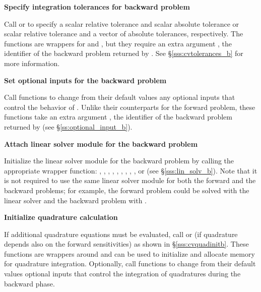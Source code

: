 \begin{Steps}
\item 
  {\bf Specify integration tolerances for backward problem}
  
  Call  or 
  to specify a scalar relative tolerance and scalar absolute tolerance or
  scalar relative tolerance and a vector of absolute tolerances, respectively.
  The functions are wrappers for  and
  , but they require an extra argument ,
  the identifier of the backward problem returned by .
  See \S\ref{sss:cvtolerances_b} for more information.


\item
  {\bf Set optional inputs for the backward problem}

  Call  functions to change from their default values
  any optional inputs that control the behavior of {\cvodes}. Unlike
  their counterparts for the forward problem, these functions take an
  extra argument , the identifier of the backward problem returned 
  by  (see \S\ref{ss:optional_input_b}).


\item \label{i:lin_solverB}
  {\bf Attach linear solver module for the backward problem}

  Initialize the linear solver module 
  for the backward problem by calling the appropriate wrapper
  function: , , , ,
  , , , ,
  , or  (see \S\ref{sss:lin_solv_b}).  Note that
  it is not required to use the same linear solver module for both the forward 
  and the backward problems; for example, the forward problem could be solved
  with the {\cvdense} linear solver and the backward problem with {\cvspgmr}.

\item \label{i:quadB}
  {\bf Initialize quadrature calculation}

  If additional quadrature equations must be evaluated, 
  call  or  (if quadrature depends also on the
  forward sensitivities) as shown in \S\ref{sss:cvquadinitb}. These functions are
  wrappers around  and can be used to initialize and allocate 
  memory for quadrature integration. Optionally, call  functions 
  to change from their default values optional inputs that control the integration 
  of quadratures during the backward phase.


\end{Steps}
